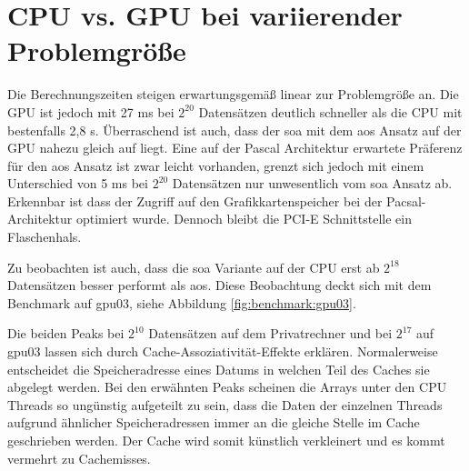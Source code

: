 

\section{CPU vs. GPU bei variierender Problemgröße}
Die Berechnungszeiten steigen erwartungsgemäß linear zur Problemgröße an. Die GPU ist jedoch mit 27 ms bei $2^{20}$ Datensätzen deutlich schneller als die CPU mit bestenfalls 2,8 s. Überraschend ist auch, dass der \gls{soa} mit dem \gls{aos} Ansatz auf der GPU nahezu gleich auf liegt. Eine auf der Pascal Architektur erwartete Präferenz für den \gls{aos} Ansatz ist zwar leicht vorhanden, grenzt sich jedoch mit einem Unterschied von 5 ms bei $2^{20}$ Datensätzen nur unwesentlich vom \gls{soa} Ansatz ab.
Erkennbar ist dass der Zugriff auf den Grafikkartenspeicher bei der Pacsal-Architektur optimiert wurde. Dennoch bleibt die PCI-E Schnittstelle ein Flaschenhals.

Zu beobachten ist auch, dass die \gls{soa} Variante auf der CPU erst ab $2^{18}$ Datensätzen besser performt als \gls{aos}. Diese Beobachtung deckt sich mit dem Benchmark auf gpu03, siehe Abbildung \ref{fig:benchmark:gpu03}.

Die beiden Peaks bei $2^{10}$ Datensätzen auf dem Privatrechner und bei $2^{17}$ auf gpu03 lassen sich durch Cache-Assoziativität-Effekte erklären. Normalerweise entscheidet die Speicheradresse eines Datums in welchen Teil des Caches sie abgelegt werden. Bei den erwähnten Peaks scheinen die Arrays unter den CPU Threads so ungünstig aufgeteilt zu sein, dass die Daten der einzelnen Threads aufgrund ähnlicher Speicheradressen immer an die gleiche Stelle im Cache geschrieben werden. Der Cache wird somit künstlich verkleinert und es kommt vermehrt zu Cachemisses.





